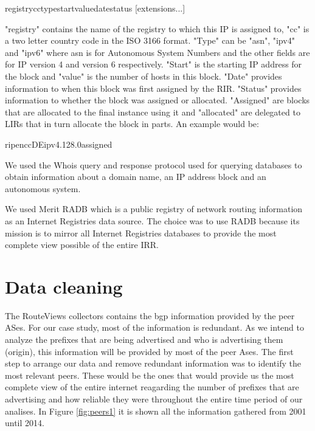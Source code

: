 \documentclass[11pt,a4paper]{scrreprt}
\begin{document}
\hspace{1cm}	 registry\textbar cc\textbar type\textbar start\textbar value\textbar date\textbar status [\textbar extensions...]
	
\vspace{5mm}

"registry" contains the name of the registry to which this IP is assigned to, "cc" is a two letter country code in the ISO 3166 format. "Type" can be "asn", "ipv4" and "ipv6" where asn is for Autonomous System Numbers and the other fields are for IP version 4 and version 6 respectively. "Start" is the starting IP address for the block and "value" is the number of hosts in this block. "Date" provides information to when this block was first assigned by the RIR. "Status" provides information to whether the block was assigned or allocated. "Assigned" are blocks that are allocated to the final instance using it and "allocated" are delegated to LIRs that in turn allocate the block in parts. An example would be:
\vspace{5mm}

\hspace{1cm}	 ripencc\textbar DE\textbar ipv4.128.0\textbar assigned

\vspace{5mm}

We used the Whois \cite{Whois} query and response protocol used for querying databases to obtain information about a domain name, an IP address block and an autonomous system. 

We used Merit RADB \cite{RADB} which is a public registry of network routing information as an Internet Registries data source. The choice was to use RADB because its mission is to mirror all Internet Registries  databases to provide the most complete view possible of the entire IRR. 

\section{Data cleaning}
The RouteViews collectors contains the bgp information provided by the peer ASes. For our case study, most of the information is redundant. As we intend to analyze the prefixes that are being advertised and who is advertising them (origin), this information will be provided by most of the peer Ases. The first step to arrange our data and remove redundant information was to identify the most relevant peers. These would be the ones that would provide us the most complete view of the entire internet reagarding the number of prefixes that are advertising and how reliable they were throughout the entire time period of our analises. In Figure \ref{fig:peers1} it is shown all the information gathered from 2001 until 2014. 
\end{document}
